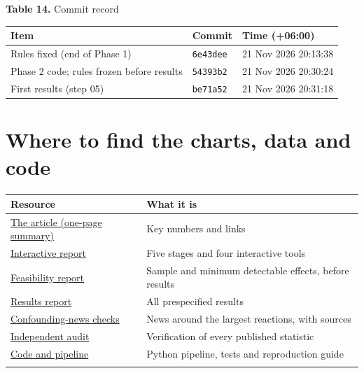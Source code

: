 \documentclass[12pt,a4paper]{article}
\begin{document}
\par\noindent\begin{minipage}{\textwidth}\hypertarget{tab-freeze}{}
\textbf{Table 14.} Commit record

{\small\setlength{\tabcolsep}{4pt}\begin{tabularx}{\textwidth}{Xll}
\toprule
\textbf{Item} & \textbf{Commit} & \textbf{Time (+06:00)} \\
\midrule
Rules fixed (end of Phase 1) & \texttt{6e43dee} & 21 Nov 2026 20:13:38 \\
Phase 2 code; rules frozen before results & \texttt{54393b2} & 21 Nov 2026 20:30:24 \\
First results (step 05) & \texttt{be71a52} & 21 Nov 2026 20:31:18 \\
\bottomrule
\end{tabularx}}
\vspace{6pt}

\end{minipage}\par\vspace{4pt}

\section*{Where to find the charts, data and code}
{\small\setlength{\tabcolsep}{4pt}\begin{tabularx}{\textwidth}{XX}
\toprule
\textbf{Resource} & \textbf{What it is} \\
\midrule
\href{https://nahianibnat-2000.github.io/space-shock/index.html}{The article (one-page summary)} & Key numbers and links \\
\href{https://nahianibnat-2000.github.io/space-shock/site/index.html}{Interactive report} & Five stages and four interactive tools \\
\href{https://github.com/NahianIbnat-2000/space-shock/blob/master/reports/04_feasibility_report.md}{Feasibility report} & Sample and minimum detectable effects, before results \\
\href{https://github.com/NahianIbnat-2000/space-shock/blob/master/reports/05_results.md}{Results report} & All prespecified results \\
\href{https://github.com/NahianIbnat-2000/space-shock/blob/master/docs/CONFOUNDING_NEWS.md}{Confounding-news checks} & News around the largest reactions, with sources \\
\href{https://github.com/NahianIbnat-2000/space-shock/blob/master/audit/AUDIT_REPORT.md}{Independent audit} & Verification of every published statistic \\
\href{https://github.com/NahianIbnat-2000/space-shock}{Code and pipeline} & Python pipeline, tests and reproduction guide \\
 &  \\
\bottomrule
\end{tabularx}}
\vspace{6pt}
\end{document}
